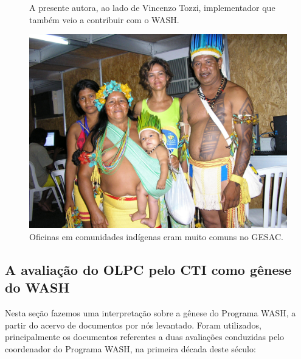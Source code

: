 \documentclass[
12pt,		%
openright,	%
twoside,  %
a4paper,			%
chapter=TITLE,		%
english,			%
french,				%
spanish,			%
brazil				%
]{USPSC-classe/USPSC}
\begin{document}
\begin{figure}[max size={\textwidth}{\textheight}]
\begin{minipage}[b]{0.4\linewidth}
                \caption{A presente autora, ao lado de Vincenzo Tozzi, implementador que tamb\'em veio a contribuir com o WASH.}
                \label{4459669909728990ef00df4bdb6a369f3449704e}
\end{minipage}
\hspace{0.5cm}
\begin{minipage}[b]{0.4\linewidth}
        \centering
                \includegraphics[width=1.0\linewidth]{../../imagens/povo.JPG}
                \caption{Oficinas em comunidades ind\'{i}genas eram muito comuns no GESAC.}
                \label{50c13a4f82feece9e41db915d8e5bc4c5d5094dd}
\end{minipage}%
\hspace{0.5cm}
\end{figure}



\subsection[A avalia\c{c}\~ao do OLPC pelo CTI como g\^enese do WASH]{A avalia\c{c}\~ao do OLPC pelo CTI como g\^enese do WASH}\label{A avalia\c{c}\~ao do OLPC pelo CTI como g\^enese do WASH}
Nesta se\c{c}\~ao fazemos uma interpreta\c{c}\~ao sobre a g\^enese do Programa WASH, a partir do acervo de documentos por n\'os levantado. Foram utilizados, principalmente  os documentos referentes a duas avalia\c{c}\~oes conduzidas pelo coordenador do Programa WASH, na primeira d\'ecada deste s\'eculo:
\end{document}

